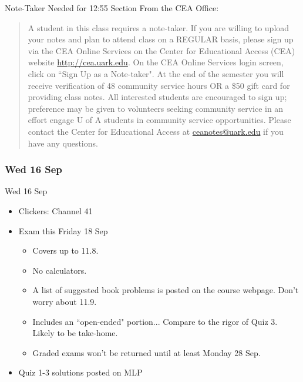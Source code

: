 \documentclass[12pt]{beamer}
\theoremstyle{plain}
\theoremstyle{definition}
\begin{document}
\begin{frame}{\small Note-Taker Needed for 12:55 Section}\footnotesize
From the CEA Office:

\begin{quotation}%
A student in this class requires a note-taker. If you are willing to upload your notes and plan to attend class on a REGULAR basis, please sign up via the CEA Online Services on the Center for Educational Access (CEA) website \url{http://cea.uark.edu}. On the CEA Online Services login screen, click on ``Sign Up as a Note-taker". 
%
At the end of the semester you will receive verification of 48 community service hours OR a \$50 gift card for providing class notes. All interested students are encouraged to sign up; preference may be given to volunteers seeking community service in an effort engage U of A students in community service opportunities. 
%
Please contact the Center for Educational Access at \url{ceanotes@uark.edu} if you have any questions.
\end{quotation}
\end{frame}

\subsubsection{Wed 16 Sep}
\begin{frame}{Wed 16 Sep}
\begin{itemize}
\item Clickers: Channel 41
\item Exam this Friday 18 Sep
	\begin{itemize}
	\item Covers up to 11.8.  
	\item No calculators.
	\item A list of suggested book problems is posted on the course webpage.  Don't worry about 11.9.
	\item Includes an ``open-ended" portion... Compare to the rigor of Quiz 3.  Likely to be take-home.
	\item Graded exams won't be returned until at least Monday 28 Sep.
	\end{itemize}
\item Quiz 1-3 solutions posted on MLP
\end{itemize}
\end{frame}
\end{document}
